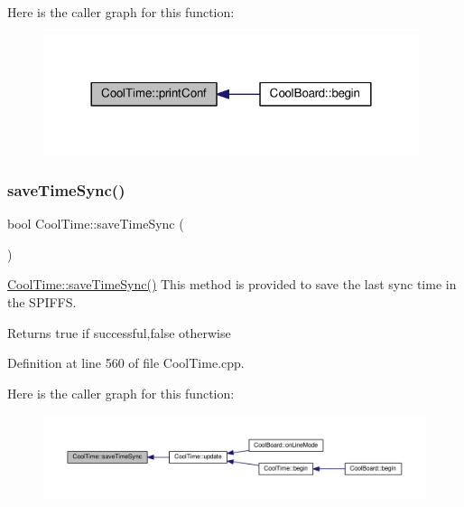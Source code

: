Here is the caller graph for this function\+:\nopagebreak
\begin{figure}[H]
\begin{center}
\leavevmode
\includegraphics[width=312pt]{class_cool_time_af355e7f9b3898211cd2ff25eab5933b1_icgraph}
\end{center}
\end{figure}
\mbox{\label{class_cool_time_ae9658c9b377510d469e3b88edf33ee85}} 
\subsubsection{\texorpdfstring{save\+Time\+Sync()}{saveTimeSync()}}
{\footnotesize\ttfamily bool Cool\+Time\+::save\+Time\+Sync (\begin{DoxyParamCaption}{ }\end{DoxyParamCaption})}

\hyperlink{class_cool_time_ae9658c9b377510d469e3b88edf33ee85}{Cool\+Time\+::save\+Time\+Sync()} This method is provided to save the last sync time in the S\+P\+I\+F\+FS.

\begin{DoxyReturn}{Returns}
true if successful,false otherwise 
\end{DoxyReturn}


Definition at line 560 of file Cool\+Time.\+cpp.

Here is the caller graph for this function\+:\nopagebreak
\begin{figure}[H]
\begin{center}
\leavevmode
\includegraphics[width=350pt]{class_cool_time_ae9658c9b377510d469e3b88edf33ee85_icgraph}
\end{center}
\end{figure}
\mbox{\label{class_cool_time_a236a38d120dc53bc67456d763838c5a1}} 
